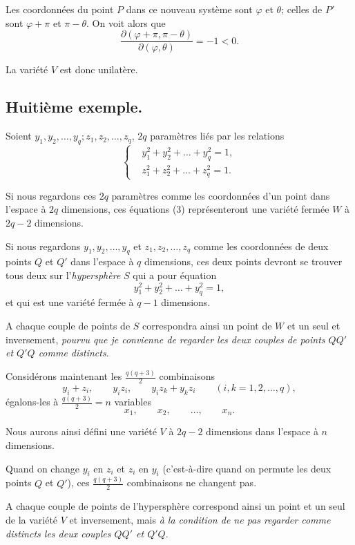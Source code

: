 \documentclass{article}
\begin{document}
Les coordonnées du point $P$ dans ce nouveau système sont $\varphi$ et $\theta$; celles de $P'$ sont $\varphi + \pi$ et $\pi - \theta$. On voit alors que
\[ \frac{\partial(\varphi + \pi, \pi - \theta)}{\partial(\varphi, \theta)} = -1 < 0. \]

La variété $V$ est donc unilatère.

\subsection*{Huitième exemple.}

Soient $y_{1}, y_{2}, \ldots, y_{q}; z_{1}, z_{2}, \ldots, z_{q}$, $2q$ paramètres liés par les relations
\[ \left\{ \begin{aligned} &y^{2}_{1} + y^{2}_{2} + \ldots + y^{2}_{q} = 1,\\ &z^{2}_{1} + z^{2}_{2} + \ldots + z^{2}_{q} = 1. \end{aligned} \right. \tag{3} \]

Si nous regardons ces $2q$ paramètres comme les coordonnées d'un point dans l'espace à $2q$ dimensions, ces équations (3) représenteront une variété fermée $W$ à $2q - 2$ dimensions.

Si nous regardons $y_{1}, y_{2}, \ldots, y_{q}$ et $z_{1}, z_{2}, \ldots, z_{q}$ comme les coordonnées de deux points $Q$ et $Q'$ dans l'espace à $q$ dimensions, ces deux points devront se trouver tous deux sur l'\emph{hypersphère} $S$ qui a pour équation
\[ y^{2}_{1} + y^{2}_{2} + \ldots + y^{2}_{q} = 1, \]
et qui est une variété fermée à $q - 1$ dimensions.

A chaque couple de points de $S$ correspondra ainsi un point de $W$ et un seul et inversement, \emph{pourvu que je convienne de regarder les deux couples de points $QQ'$ et $Q'Q$ comme distincts}.

Considérons maintenant les $\frac{q(q + 3)}{2}$ combinaisons
\[ y_{i} + z_{i}, \qquad y_{i}z_{i}, \qquad y_{i}z_{k} + y_{k}z_{i} \qquad (i, k = 1, 2, \ldots, q), \]
égalons-les à $\frac{q(q + 3)}{2} = n$ variables
\[ x_{1}, \qquad x_{2}, \qquad \ldots, \qquad x_{n}. \]

Nous aurons ainsi défini une variété $V$ à $2q - 2$ dimensions dans l'espace à $n$ dimensions.

Quand on change $y_{i}$ en $z_{i}$ et $z_{i}$ en $y_{i}$ (c'est-à-dire quand on permute les deux points $Q$ et $Q'$), ces $\frac{q(q + 3)}{2}$ combinaisons ne changent pas.

A chaque couple de points de l'hypersphère correspond ainsi un point et un seul de la variété $V$ et inversement, mais \emph{à la condition de ne pas regarder comme distincts les deux couples $QQ'$ et $Q'Q$}.
\end{document}
